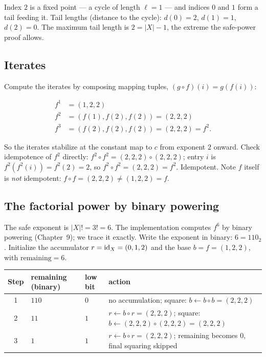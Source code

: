 Index $2$ is a fixed point --- a cycle of length $\ell = 1$ --- and
indices $0$ and $1$ form a tail feeding it. Tail lengths (distance to
the cycle): $d(0) = 2$, $d(1) = 1$, $d(2) = 0$. The maximum tail length
is $2 = |X| - 1$, the extreme the safe-power proof allows.

\subsection{Iterates}

Compute the iterates by composing mapping tuples,
$(g \circ f)(i) = g(f(i))$:

\begin{align*}
f^1 &= (1, 2, 2) \\
f^2 &= (f(1), f(2), f(2)) = (2, 2, 2) \\
f^3 &= (f(2), f(2), f(2)) = (2, 2, 2) = f^2 .
\end{align*}

So the iterates stabilize at the constant map to $c$ from exponent $2$
onward. Check idempotence of $f^2$ directly:
$f^2 \circ f^2 = (2,2,2) \circ (2,2,2)$; entry $i$ is
$f^2(f^2(i)) = f^2(2) = 2$, so $f^2 \circ f^2 = (2,2,2) = f^2$.
Idempotent. Note $f$ itself is \emph{not} idempotent:
$f \circ f = (2,2,2) \ne (1,2,2) = f$.

\subsection{The factorial power by binary powering}

The safe exponent is $|X|! = 3! = 6$. The implementation computes
$f^6$ by binary powering (Chapter~9); we trace it exactly. Write the
exponent in binary: $6 = 110_2$. Initialize the accumulator
$r = \mathrm{id}_X = (0, 1, 2)$ and the base $b = f = (1, 2, 2)$, with
$\mathrm{remaining} = 6$.

\begin{center}
\begin{tabular}{@{}clll@{}}
\toprule
Step & remaining (binary) & low bit & action \\
\midrule
1 & $110$ & $0$ & no accumulation; square: $b \leftarrow b \circ b = (2,2,2)$ \\
2 & $11$  & $1$ & $r \leftarrow b \circ r = (2,2,2)$; square: $b \leftarrow (2,2,2)\circ(2,2,2) = (2,2,2)$ \\
3 & $1$   & $1$ & $r \leftarrow b \circ r = (2,2,2)$; remaining becomes $0$, final squaring skipped \\
\bottomrule
\end{tabular}
\end{center}


